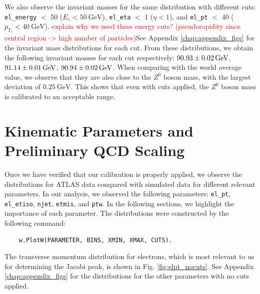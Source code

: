 \documentclass[a4paper]{report}
\numberwithin{equation}{section}
\begin{document}
We also observe the invariant masses for the same distribution with different cuts: \texttt{el\_energy} $<$ 50 ($E_e < \SI{50}{\giga\electronvolt}$), \texttt{el\_eta} $<$ 1 
($\eta < 1$), and \texttt{el\_pt} $<$ 40 ($p_{T_e} < \SI{40}{\giga\electronvolt}$). \textcolor{red}{explain why we used these energy cuts? 
(pseudorapidity since central region -> high number of particles)}See Appendix \ref{chap:appendix_figs} for the 
invariant mass distributions for each cut. From these distributions, we obtain the following invariant masses for each cut 
respectively: 
$\SI{90.93 \pm 0.02}{\giga\electronvolt}$, $\SI{91.14 \pm 0.01}{\giga\electronvolt}$, $\SI{90.94 \pm 0.02}{\giga\electronvolt}$. 
When comparing with the world average value, we observe that they are also close to the $Z^0$ boson mass, with the largest deviation 
of $\SI{0.25}{\giga\electronvolt}$. This shows that even with cuts applied, the $Z^0$ boson mass is calibrated to an acceptable range. 

\section{Kinematic Parameters and Preliminary QCD Scaling}

Once we have verified that our calibration is properly applied, we observe the distributions for ATLAS data compared with 
simulated data for different relevant parameters. In our analysis, we observed the following parameters: 
\texttt{el\_pt}, \texttt{el\_etiso}, \texttt{njet}, \texttt{etmis}, and \texttt{ptw}. In the following sections, we highlight
the importance of each parameter. The distributions were constructed by the following command:
\begin{verbatim}
    w.PlotW(PARAMETER, BINS, XMIN, XMAX, CUTS).
\end{verbatim} 
The transverse momentum distribution for electrons, which is most relevant to us for determining the Jacobi peak, is shown 
in Fig. \ref{fig:elpt_nocuts}. See Appendix \ref{chap:appendix_figs} for the distributions for the other parameters with no cuts applied. \par 
\end{document}
